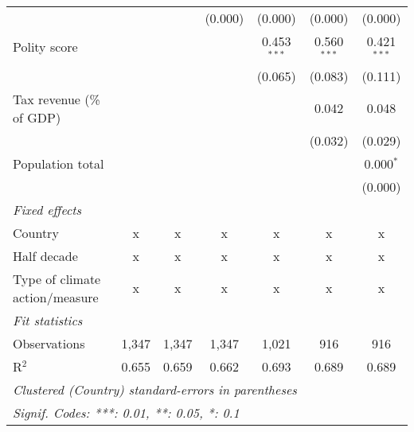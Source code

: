 \begin{tabular}{lcccccc}
                                                                                          &         &               & (0.000)        & (0.000)        & (0.000)        & (0.000)\\   
   Polity score                                                                           &         &               &                & 0.453$^{***}$  & 0.560$^{***}$  & 0.421$^{***}$\\   
                                                                                          &         &               &                & (0.065)        & (0.083)        & (0.111)\\   
   Tax revenue (\% of GDP)                                                                &         &               &                &                & 0.042          & 0.048\\   
                                                                                          &         &               &                &                & (0.032)        & (0.029)\\   
   Population total                                                                       &         &               &                &                &                & 0.000$^{*}$\\   
                                                                                          &         &               &                &                &                & (0.000)\\   
   \emph{Fixed effects}\\
   Country                                                                                & x       & x             & x              & x              & x              & x\\  
   Half decade                                                                            & x       & x             & x              & x              & x              & x\\  
   Type of climate action/measure                                                         & x       & x             & x              & x              & x              & x\\  
   \midrule \emph{Fit statistics}\\
   Observations                                                                           & 1,347   & 1,347         & 1,347          & 1,021          & 916            & 916\\  
   R$^2$                                                                                  & 0.655   & 0.659         & 0.662          & 0.693          & 0.689          & 0.689\\  
   \midrule
   \multicolumn{7}{l}{\emph{Clustered (Country) standard-errors in parentheses}}\\
   \multicolumn{7}{l}{\emph{Signif. Codes: ***: 0.01, **: 0.05, *: 0.1}}\\
\end{tabular}
\par\endgroup


